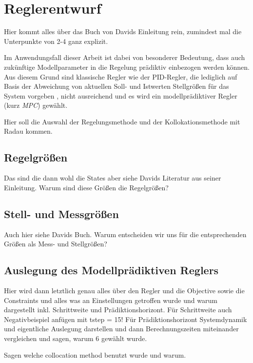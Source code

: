 \chapter{Reglerentwurf} \label{ch_Reglerentwurf}
Hier kommt alles über das Buch von Davids Einleitung rein, zumindest mal die Unterpunkte von 2-4 ganz explizit.

Im Anwendungsfall dieser Arbeit ist dabei von besonderer Bedeutung, dass auch zukünftige Modellparameter in die Regelung prädiktiv einbezogen werden können.
Aus diesem Grund sind klassische Regler wie der PID-Regler, die lediglich auf Basis der Abweichung von aktuellen Soll- und Istwerten Stellgrößen für das System vorgeben \cite[S.408]{Lunze}, nicht ausreichend und es wird ein modellprädiktiver Regler (kurz \textit{MPC}) gewählt.

Hier soll die Auswahl der Regelungsmethode und der Kollokationsmethode mit Radau kommen.

\section{Regelgrößen} \label{sec_Regelgrößen}
Das sind die dann wohl die States aber siehe Davids Literatur aus seiner Einleitung.
Warum sind diese Größen die Regelgrößen?

\section{Stell- und Messgrößen} \label{sec_StellMessgrößen}
Auch hier siehe Davids Buch.
Warum entscheiden wir uns für die entsprechenden Größen als Mess- und Stellgrößen?

\section{Auslegung des Modellprädiktiven Reglers} \label{sec_AuslegungMPC}
Hier wird dann letztlich genau alles über den Regler und die Objective sowie die Constraints und alles was an Einstellungen getroffen wurde und warum dargestellt inkl. Schrittweite und Prädiktionshorizont. Für Schrittweite auch Negativbeispiel anfügen mit tstep = 15! Für Prädiktionshorizont Systemdynamik und eigentliche Auslegung darstellen und dann Berechnungszeiten miteinander vergleichen und sagen, warum 6 gewählt wurde.

Sagen welche collocation method benutzt wurde und warum.

